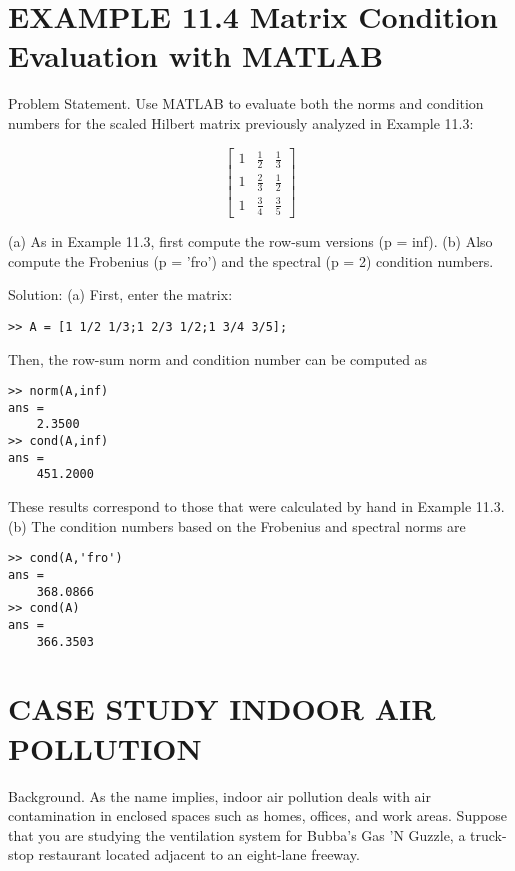 \documentclass[../main.tex]{subfiles}
\begin{document}
\section*{EXAMPLE 11.4 Matrix Condition Evaluation with MATLAB}

Problem Statement. Use MATLAB to evaluate both the norms and condition numbers
for the scaled Hilbert matrix previously analyzed in Example 11.3:

\begin{equation}
\begin{bmatrix}
1 &\frac{1}{2}  &\frac{1}{3} \\ 
1  &\frac{2}{3}  &\frac{1}{2} \\ 
1  &\frac{3}{4}  &\frac{3}{5}
\end{bmatrix}
\end{equation}

(a) As in Example 11.3, first compute the row-sum versions (p = inf). (b) Also compute the Frobenius (p = 'fro') and the spectral (p = 2) condition numbers.

Solution: (a) First, enter the matrix:

\begin{lstlisting}[numbers=none]
>> A = [1 1/2 1/3;1 2/3 1/2;1 3/4 3/5];
\end{lstlisting}

Then, the row-sum norm and condition number can be computed as

\begin{lstlisting}[numbers=none]
>> norm(A,inf)
ans =
	2.3500
>> cond(A,inf)
ans =
	451.2000
\end{lstlisting}

These results correspond to those that were calculated by hand in Example 11.3. (b) The condition numbers based on the Frobenius and spectral norms are

\begin{lstlisting}[numbers=none]
>> cond(A,'fro')
ans =
	368.0866
>> cond(A)
ans =
	366.3503
\end{lstlisting}


\section{CASE STUDY INDOOR AIR POLLUTION}

Background. As the name implies, indoor air pollution deals with air contamination
in enclosed spaces such as homes, offices, and work areas. Suppose that you are studying
the ventilation system for Bubba's Gas 'N Guzzle, a truck-stop restaurant located adjacent
to an eight-lane freeway.
\end{document}
